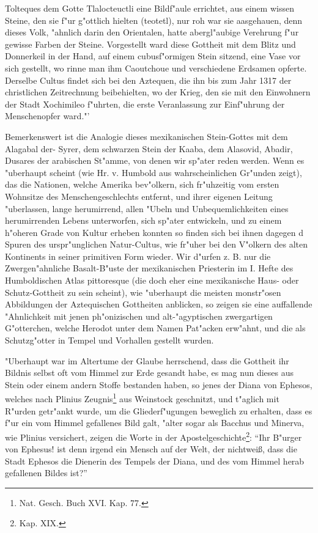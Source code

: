 \documentclass[a4paper, 11pt, oneside, polutonikogreek, german]{article}
\begin{document}
Tolteques dem Gotte Tlalocteuctli eine Bildf"aule errichtet, aus einem wissen Steine, den sie f"ur g"ottlich hielten (teotetl), nur roh war sie aasgehauen, denn dieses Volk, "ahnlich darin den Orientalen, hatte abergl"aubige Verehrung f"ur gewisse Farben der Steine. Vorgestellt ward diese Gottheit mit dem Blitz und Donnerkeil in der Hand, auf einem cubusf"ormigen Stein sitzend, eine Vase vor sich gestellt, wo rinne man ihm Caoutchoue und verschiedene Erdsamen opferte. Derselbe Cultus findet sich bei den Aztequen, die ihn bis zum Jahr 1317 der christlichen Zeitrechnung beibehielten, wo der Krieg, den sie mit den Einwohnern der Stadt Xochimileo f"uhrten, die erste Veranlassung zur Einf"uhrung der Menschenopfer ward."'

Bemerkenswert ist die Analogie dieses mexikanischen Stein-Gottes mit dem Alagabal der- Syrer, dem schwarzen Stein der Kaaba, dem Alasovid, Abadir, Dusares der arabischen St"amme, von denen wir sp"ater reden werden. Wenn es "uberhaupt scheint (wie Hr. v. Humbold aus wahrscheinlichen Gr"unden zeigt), das die Nationen, welche Amerika bev"olkern, sich fr"uhzeitig vom ersten Wohnsitze des Menschengeschlechts entfernt, und ihrer eigenen Leitung "uberlassen, lange herumirrend, allen "Ubeln und Unbequemlichkeiten eines herumirrenden Lebens unterworfen, sich sp"ater entwickeln, und zu einem h"oheren Grade von Kultur erheben konnten so finden sich bei ihnen dagegen d Spuren des urspr"unglichen Natur-Cultus, wie fr"uher bei den V"olkern des alten Kontinents in seiner primitiven Form wieder. Wir d"urfen z. B. nur die Zwergen"ahnliche Basalt-B"uste der mexikanischen Priesterin im I. Hefte des Humboldischen Atlas pittoresque (die doch eher eine mexikanische Haus- oder Schutz-Gottheit zu sein scheint), wie "uberhaupt die meisten monstr"osen Abbildungen der Aztequischen Gottheiten anblicken, so zeigen sie eine auffallende "Ahnlichkeit mit jenen ph"onizischen und alt-"agyptischen zwergartigen G"otterchen, welche Herodot unter dem Namen Pat"acken erw"ahnt, und die als Schutzg"otter in Tempel und Vorhallen gestellt wurden.

"Uberhaupt war im Altertume der Glaube herrschend, dass die Gottheit ihr Bildnis selbst oft vom Himmel zur Erde gesandt habe, es mag nun dieses aus Stein oder einem andern Stoffe bestanden haben, so jenes der Diana von Ephesos, welches nach Plinius Zeugnis\footnote{Nat. Gesch. Buch XVI. Kap. 77.} aus Weinstock geschnitzt, und t"aglich mit R"urden getr"ankt wurde, um die Gliederf"ugungen beweglich zu erhalten, dass es f"ur ein vom Himmel gefallenes Bild galt, "alter sogar als Bacchus und Minerva, wie Plinius versichert, zeigen die Worte in der Apostelgeschichte\footnote{Kap. XIX.}: "`Ihr B"urger von Ephesus! ist denn irgend ein Mensch auf der Welt, der nichtweiß, dass die Stadt Ephesos die Dienerin des Tempels der Diana, und des vom Himmel herab gefallenen Bildes ist?"'
\end{document}
